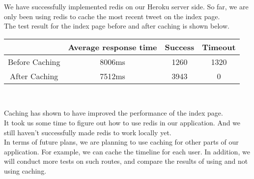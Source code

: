 \documentclass[]{article}
\begin{document}
	We have successfully implemented redis on our Heroku server side. 
        So far, we are only been using redis to cache the most recent tweet on 
        the index page.\\
        The test result for the index page before and after caching is shown below.
        \begin{center}
        \begin{tabular}{|c|c|c|c|}
	\hline
	  & Average response time & Success & Timeout\\ \hline
	Before Caching & 8006ms & 1260 & 1320\\
	After Caching & 7512ms & 3943 & 0 \\ \hline
	\end{tabular} \\
        \end{center}
        Caching has shown to have improved the performance of the index page.\\
        It took us some time to figure out how to use redis in our application. And we still haven't 
        successfully made redis to work locally yet.\\
        In terms of future plans, 
        we are planning to use caching for other parts of our application. 
        For example, we can cache the timeline for each user. 
        In addition, we will conduct more tests on such routes, and compare the results of using and 
        not using caching.\\
\end{document}
